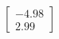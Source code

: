 \documentclass[preview]{standalone}
\begin{document}
\begin{align*}
\begin{bmatrix} -4.98 \\ 2.99 \end{bmatrix}
\end{align*}
\end{document}
